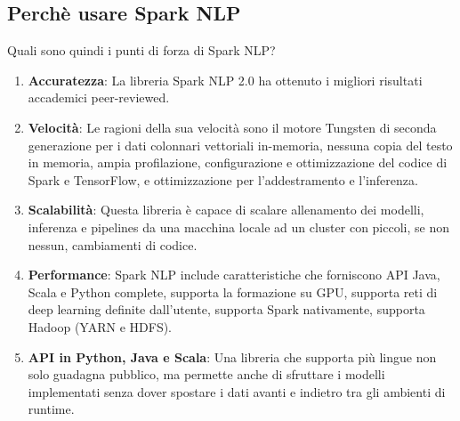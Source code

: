 \subsection{Perchè usare Spark NLP}
Quali sono quindi i punti di forza di Spark NLP?
\begin{enumerate}
    \item \textbf{Accuratezza}: La libreria Spark NLP 2.0 ha ottenuto i migliori risultati accademici peer-reviewed.
    \item \textbf{Velocità}: Le ragioni della sua velocità sono il motore Tungsten di seconda generazione per i dati colonnari vettoriali in-memoria, nessuna copia del testo in memoria, ampia profilazione, configurazione e ottimizzazione del codice di Spark e TensorFlow, e ottimizzazione per l'addestramento e l'inferenza.
    \item \textbf{Scalabilità}: Questa libreria è capace di scalare allenamento dei modelli, inferenza e pipelines da una macchina locale ad un cluster con piccoli, se non nessun, cambiamenti di codice.
    \item \textbf{Performance}: Spark NLP include caratteristiche che forniscono API Java, Scala e Python complete, supporta la formazione su GPU, supporta reti di deep learning definite dall'utente, supporta Spark nativamente, supporta Hadoop (YARN e HDFS).
    \item \textbf{API in Python, Java e Scala}: Una libreria che supporta più lingue non solo guadagna pubblico, ma permette anche di sfruttare i modelli implementati senza dover spostare i dati avanti e indietro tra gli ambienti di runtime.
\end{enumerate}